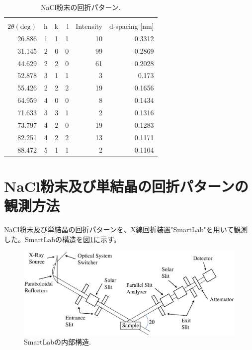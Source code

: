 \documentclass[11pt,a4j,uplatex]{jsarticle}
\begin{document}
\begin{table}[htbp]
 \begin{center}
  \caption{NaCl粉末の回折パターン\cite{powder}.}
  \begin{tabular}{|r|r|r|r|r|r|}  \hline
                           & \multicolumn{3}{c|}{} &   &                                \\
   $2\theta(\mathrm{deg})$ & h                     & k & l & Intensity & d-spacing [nm] \\  \hline \hline
   26.886                  & 1                     & 1 & 1 & 10        & 0.3312         \\
   31.145                  & 2                     & 0 & 0 & 99        & 0.2869         \\
   44.629                  & 2                     & 2 & 0 & 61        & 0.2028         \\
   52.878                  & 3                     & 1 & 1 & 3         & 0.173          \\
   55.426                  & 2                     & 2 & 2 & 19        & 0.1656         \\
   64.959                  & 4                     & 0 & 0 & 8         & 0.1434         \\
   71.633                  & 3                     & 3 & 1 & 2         & 0.1316         \\
   73.797                  & 4                     & 2 & 0 & 19        & 0.1283         \\
   82.251                  & 4                     & 2 & 2 & 13        & 0.1171         \\
   88.472                  & 5                     & 1 & 1 & 2         & 0.1104         \\ \hline
  \end{tabular}
  \label{data}
 \end{center}
\end{table}

\newpage
\section{NaCl粉末及び単結晶の回折パターンの観測方法}

NaCl粉末及び単結晶の回折パターンを、X線回折装置"SmartLab"を用いて観測した。$\mathrm{SmartLab}$の構造を図\ref{smartlab}に示す。

\begin{figure}[htb]
 \centering
 \includegraphics[clip,width=12cm]{XRD.eps}
 \caption{SmartLabの内部構造.}
 \label{smartlab}
\end{figure}
\end{document}
